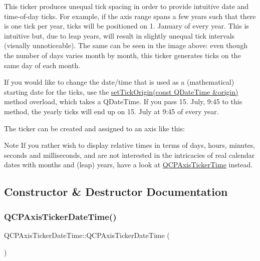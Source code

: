 This ticker produces unequal tick spacing in order to provide intuitive date and time-\/of-\/day ticks. For example, if the axis range spans a few years such that there is one tick per year, ticks will be positioned on 1. January of every year. This is intuitive but, due to leap years, will result in slightly unequal tick intervals (visually unnoticeable). The same can be seen in the image above\+: even though the number of days varies month by month, this ticker generates ticks on the same day of each month.

If you would like to change the date/time that is used as a (mathematical) starting date for the ticks, use the \hyperlink{classQCPAxisTickerDateTime_a2ea905872b8171847a49a5e093fb0c48}{set\+Tick\+Origin(const Q\+Date\+Time \&origin)} method overload, which takes a Q\+Date\+Time. If you pass 15. July, 9\+:45 to this method, the yearly ticks will end up on 15. July at 9\+:45 of every year.

The ticker can be created and assigned to an axis like this\+: 
\begin{DoxyCodeInclude}
\end{DoxyCodeInclude}
 \begin{DoxyNote}{Note}
If you rather wish to display relative times in terms of days, hours, minutes, seconds and milliseconds, and are not interested in the intricacies of real calendar dates with months and (leap) years, have a look at \hyperlink{classQCPAxisTickerTime}{Q\+C\+P\+Axis\+Ticker\+Time} instead. 
\end{DoxyNote}


\subsection{Constructor \& Destructor Documentation}
\mbox{\label{classQCPAxisTickerDateTime_a84cc5c6bbc7c99c1f9bd4b3a392e1b9d}} 
\subsubsection{\texorpdfstring{Q\+C\+P\+Axis\+Ticker\+Date\+Time()}{QCPAxisTickerDateTime()}}
{\footnotesize\ttfamily Q\+C\+P\+Axis\+Ticker\+Date\+Time\+::\+Q\+C\+P\+Axis\+Ticker\+Date\+Time (\begin{DoxyParamCaption}{ }\end{DoxyParamCaption})}


